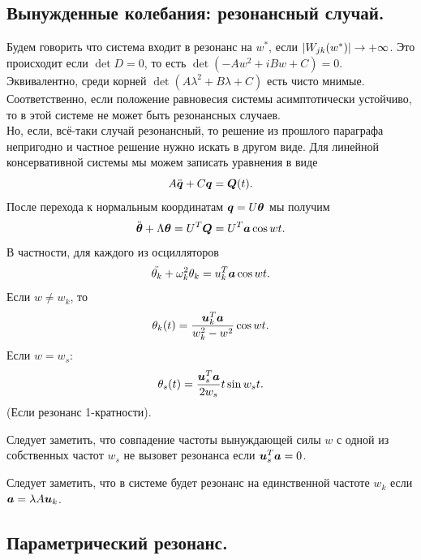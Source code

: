 \subsection{Вынужденные колебания: резонансный случай.}
Будем говорить что система входит в резонанс на $w^*$, если $|W_{jk}(w^*)| \rightarrow +\infty$.
Это происходит если $\det D = 0$, то есть $\det(-A w^2 + iB w + C) = 0$.
Эквивалентно, среди корней $\det(A\lambda^2 + B\lambda + C)$ есть чисто мнимые. \\
Соответственно, если положение равновесия системы асимптотически устойчиво, то в этой системе не может быть резонансных случаев. \\
Но, если, всё-таки случай резонансный, то решение из прошлого параграфа непригодно и частное решение нужно искать в другом виде.
Для линейной консервативной системы мы можем записать уравнения в виде
\[
    A\ddot{\boldsymbol{q}} + C\boldsymbol{q} = \boldsymbol{Q}(t).
\]
После перехода к нормальным координатам $\boldsymbol{q} = U\boldsymbol{\theta}$ мы получим
\[
    \ddot{\boldsymbol{\theta}} + \Lambda \boldsymbol{\theta} = U^{T}\boldsymbol{Q} = U^T \boldsymbol{a}\cos wt.
\]
В частности, для каждого из осцилляторов
\[
    \ddot{\theta_k} + \omega^2_k \theta_k = u_k^T \boldsymbol{a} \cos wt.
\]
Если $w \neq w_k$, то
\[
    \theta_k(t) = \dfrac{\boldsymbol{u}_k^T \boldsymbol{a}}{w^2_k - w^2}\cos wt.
\]
Если $w = w_s$:
\[
    \theta_s(t) = \dfrac{\boldsymbol{u}_s^T \boldsymbol{a}}{2w_s}t \sin w_s t.
\]
(Если резонанс 1-кратности).
\begin{note}
    Следует заметить, что совпадение частоты вынуждающей силы $w$ с одной из собственных частот $w_s$ не вызовет резонанса если $\boldsymbol{u}_s^T\boldsymbol{a} = 0$.
\end{note}
\begin{note}
    Следует заметить, что в системе будет резонанс на единственной частоте $w_k$ если $\boldsymbol{a} = \lambda A \boldsymbol{u}_k$.
\end{note}
\subsection{Параметрический резонанс.}

